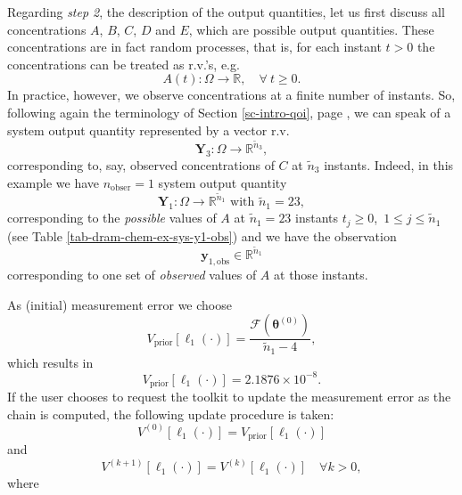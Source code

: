 Regarding {\it step 2}, the description of the output quantities, let us first discuss all concentrations $A$, $B$, $C$, $D$ and $E$, which are possible output quantities.
These concentrations are in fact random processes, that is, for each instant $t>0$ the concentrations can be treated as r.v.'s, e.g.
\begin{equation*}
A(t):\Omega\rightarrow\mathbb{R},\quad\forall~t\geqslant 0.
\end{equation*}
In practice, however, we observe concentrations at a finite number of instants.
So, following again the terminology of Section \ref{sc-intro-qoi}, page \pageref{sc-intro-qoi}, we can speak of a system output quantity
represented by a vector r.v. 
\begin{equation*}
\mathbf{Y}_3:\Omega\rightarrow\mathbb{R}^{{\tilde{n}}_3},
\end{equation*}
corresponding to, say, observed concentrations of $C$ at ${\tilde{n}}_3$ instants.
Indeed, in this example we have
$n_{\text{obser}}=1$ system output quantity
\begin{equation*}
\mathbf{Y}_1:\Omega\rightarrow\mathbb{R}^{{\tilde{n}}_1}\text{ with }{\tilde{n}}_1=23,
\end{equation*}
corresponding to the {\it possible} values of $A$ at ${\tilde{n}}_1=23$ instants $t_j\geqslant 0$,~$1\leqslant j\leqslant {\tilde{n}}_1$ (see Table \ref{tab-dram-chem-ex-sys-y1-obs})
and we have the observation 
\begin{equation*}
\mathbf{y}_{1,\text{obs}}\in\mathbb{R}^{{\tilde{n}}_1}
\end{equation*}
corresponding to one set of {\it observed} values of $A$ at those instants.

As (initial) measurement error we choose
\begin{equation*}
V_{\text{prior}}[\ell_1(\cdot)] = \frac{\mathcal{F}(\boldsymbol{\theta}^{(0)})}{{\tilde{n}}_1-4},
\end{equation*}
which results in
\begin{equation*}
V_{\text{prior}}[\ell_1(\cdot)] = 2.1876\times 10^{-8}.
\end{equation*}
If the user chooses to request the toolkit to update the measurement error as the chain is computed, the following update procedure is taken:
\begin{equation*}
V^{(0)}[\ell_1(\cdot)] = V_{\text{prior}}[\ell_1(\cdot)]
\end{equation*}
and
\begin{equation*}
V^{(k+1)}[\ell_1(\cdot)] = V^{(k)}[\ell_1(\cdot)]\quad\forall k>0,
\end{equation*}
where

